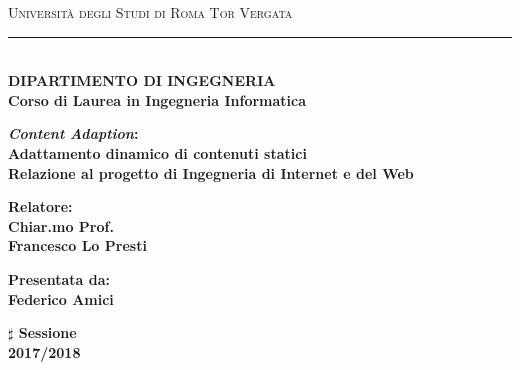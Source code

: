 \documentclass[a4paper, titlepage]{article}
\title{}
\author{}
\begin{document}
	
	\begin{titlepage}
		\begin{center}
			{{\Large{\textsc{Università degli Studi di Roma Tor Vergata}}}} \rule[0.1cm]{5.8cm}{0.5mm}\\
			{\small{\bf DIPARTIMENTO DI INGEGNERIA\\Corso di Laurea in Ingegneria Informatica}}
		\end{center}
		\vspace{15mm}
		\begin{center}
			{\LARGE{\bf\textit{ Content Adaption}:}}\\
			\vspace{3mm}
			{\LARGE{\bf Adattamento dinamico di contenuti statici}}\\
			\vspace{19mm} {\large{\bf Relazione al progetto di Ingegneria di Internet e del Web}}
		\end{center}
		\vspace{40mm}
		\par
		\noindent
		\begin{minipage}[t]{0.47\textwidth}
			{\large{\bf Relatore:\\
					Chiar.mo Prof.\\
					Francesco Lo Presti}}
		\end{minipage}
		\hfill
		\begin{minipage}[t]{0.47\textwidth}\raggedleft
			{\large{\bf Presentata da:\\
					Federico Amici}}
		\end{minipage}
		\vspace{20mm}
		\begin{center}
			{\large{\bf $\sharp$ Sessione\\
					2017/2018 }}
		\end{center}
	\end{titlepage}
	\tableofcontents
	\newpage
	
\end{document}

